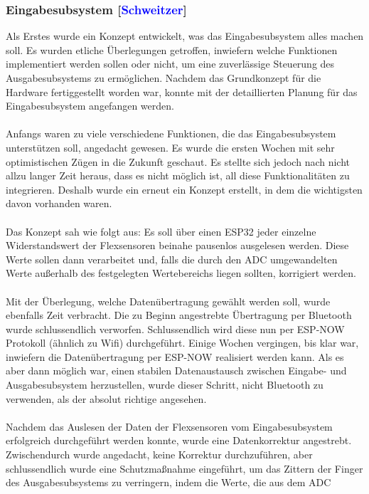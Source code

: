 \documentclass[titlepage,12pt,twoside]{article}
\begin{document}
\subsubsection{Eingabesubsystem [\textcolor{blue}{Schweitzer}]}
Als Erstes wurde ein Konzept entwickelt, was das Eingabesubsystem alles machen 
soll. Es wurden etliche Überlegungen getroffen, inwiefern welche Funktionen 
implementiert werden sollen oder nicht, um eine zuverlässige Steuerung des 
Ausgabesubsystems zu ermöglichen. Nachdem das Grundkonzept für die Hardware 
fertiggestellt worden war, konnte mit der detaillierten Planung für das 
Eingabesubsystem angefangen werden. \\
\\
Anfangs waren zu viele verschiedene Funktionen, die das Eingabesubsystem 
unterstützen soll, angedacht gewesen. Es wurde die ersten Wochen mit sehr 
optimistischen Zügen in die Zukunft geschaut. Es stellte sich jedoch nach 
nicht allzu langer Zeit heraus, dass es nicht möglich ist, all diese 
Funktionalitäten zu integrieren. Deshalb wurde ein erneut ein Konzept erstellt, 
in dem die wichtigsten davon vorhanden waren. \\
\\ 
Das Konzept sah wie folgt aus: Es soll über einen ESP32 jeder einzelne 
Widerstandswert der Flexsensoren beinahe pausenlos ausgelesen werden. 
Diese Werte sollen dann verarbeitet und, falls die durch den ADC umgewandelten
Werte außerhalb des festgelegten Wertebereichs liegen sollten, korrigiert 
werden. \\
\\
Mit der Überlegung, welche Datenübertragung gewählt werden soll, wurde 
ebenfalls Zeit verbracht. Die zu Beginn angestrebte Übertragung per Bluetooth 
wurde schlussendlich verworfen. Schlussendlich wird diese nun per ESP-NOW 
Protokoll (ähnlich zu Wifi) durchgeführt. Einige Wochen vergingen, bis klar 
war, inwiefern die Datenübertragung per ESP-NOW realisiert werden kann. Als 
es aber dann möglich war, einen stabilen Datenaustausch zwischen Eingabe- und 
Ausgabesubsystem herzustellen, wurde dieser Schritt, nicht Bluetooth zu 
verwenden, als der absolut richtige angesehen. \\
\\
Nachdem das Auslesen der Daten der Flexsensoren vom Eingabesubsystem 
erfolgreich durchgeführt werden konnte, wurde eine Datenkorrektur angestrebt. 
Zwischendurch wurde angedacht, keine Korrektur durchzuführen, aber 
schlussendlich wurde eine Schutzmaßnahme eingeführt, um das Zittern der Finger 
des Ausgabesubsystems zu verringern, indem die Werte, die aus dem ADC 
\end{document}
